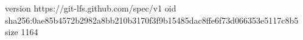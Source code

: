 version https://git-lfs.github.com/spec/v1
oid sha256:0ae85b4572b2982a8bb210b3170f3f9b15485dac8ffe6f73d066353e5117c8b5
size 1164
